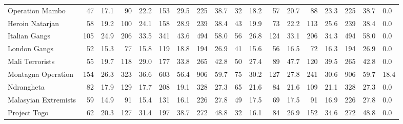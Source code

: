 \begin{tabular}{lrrrrrrrrrrrrrrrrl}
Operation Mambo      &                47 &  17.1 &   90 &  22.2 &  153 &  29.5 &  225 &  38.7 &               32 &   18.2 &   57 &   20.7 &   88 &   23.3 &  225 &  38.7 &        0.0 \\
Heroin Natarjan      &                58 &  19.2 &  100 &  24.1 &  158 &  28.9 &  239 &  38.4 &               43 &   19.9 &   73 &   22.2 &  113 &   25.6 &  239 &  38.4 &        0.0 \\
Italian Gangs        &               105 &  24.9 &  206 &  33.5 &  341 &  43.6 &  494 &  58.0 &               56 &   26.8 &  124 &   33.1 &  206 &   34.3 &  494 &  58.0 &        0.0 \\
London Gangs         &                52 &  15.3 &   77 &  15.8 &  119 &  18.8 &  194 &  26.9 &               41 &   15.6 &   56 &   16.5 &   72 &   16.3 &  194 &  26.9 &        0.0 \\
Mali Terrorists      &                55 &  19.7 &  118 &  29.0 &  177 &  33.8 &  265 &  42.8 &               50 &   27.4 &   89 &   47.7 &  120 &   39.5 &  265 &  42.8 &        0.0 \\
Montagna Operation   &               154 &  26.3 &  323 &  36.6 &  603 &  56.4 &  906 &  59.7 &               75 &   30.2 &  127 &   27.8 &  241 &   30.6 &  906 &  59.7 &       18.4 \\
Ndrangheta           &                82 &  17.9 &  129 &  17.7 &  208 &  19.1 &  328 &  27.3 &               65 &   21.6 &   84 &   21.6 &  109 &   21.1 &  328 &  27.3 &        0.0 \\
Malasyian Extremists &                59 &  14.9 &   91 &  15.4 &  131 &  16.1 &  226 &  27.8 &               49 &   17.5 &   69 &   17.5 &   91 &   16.9 &  226 &  27.8 &        0.0 \\
Project Togo         &                62 &  20.3 &  127 &  31.4 &  197 &  38.7 &  272 &  48.8 &               32 &   16.1 &   84 &   26.9 &  152 &   34.6 &  272 &  48.8 &        0.0 \\
\bottomrule
\end{tabular}
